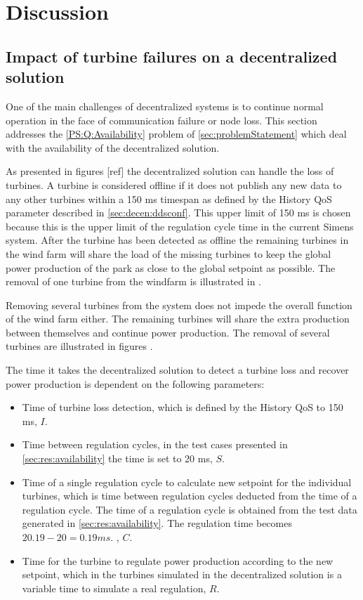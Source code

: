 \chapter{Discussion}

\section{Impact of turbine failures on a decentralized solution}
One of the main challenges of decentralized systems is to continue normal operation in the face of communication failure or node loss. This section addresses the \ref{PS:Q:Availability} problem of \cref{sec:problemStatement} which deal with the availability of the decentralized solution.

As presented in figures [ref] the decentralized solution can handle the loss of turbines. A turbine is considered offline if it does not publish any new data to any other turbines within a 150 ms timespan as defined by the History QoS parameter described in \cref{sec:decen:ddsconf}.
This upper limit of 150 ms is chosen because this is the upper limit of the regulation cycle time in the current Simens system.
After the turbine has been detected as offline the remaining turbines in the wind farm will share the load of the missing turbines to keep the global power production of the park as close to the global setpoint as possible. The removal of one turbine from the windfarm is illustrated in .

Removing several turbines from the system does not impede the overall function of the wind farm either. The remaining turbines will share the extra production between themselves and continue power production. The removal of several turbines are illustrated in figures .

The time it takes the decentralized solution to detect a turbine loss and recover power production is dependent on the following parameters:

\begin{itemize}
	\item Time of turbine loss detection, which is defined by the History QoS to 150 ms, $I$.
	\item Time between regulation cycles, in the test cases presented in \cref{sec:res:availability} the time is set to 20 ms, $S$.
	\item Time of a single regulation cycle to calculate new setpoint for the individual turbines, which is time between regulation cycles deducted from the time of a regulation cycle. The time of a regulation cycle is obtained from the test data generated in \cref{sec:res:availability}. The regulation time becomes $20.19 - 20 = 0.19 ms$. , $C$.
	\item Time for the turbine to regulate power production according to the new setpoint, which in the turbines simulated in the decentralized solution is a variable time to simulate a real regulation, $R$.
\end{itemize}

